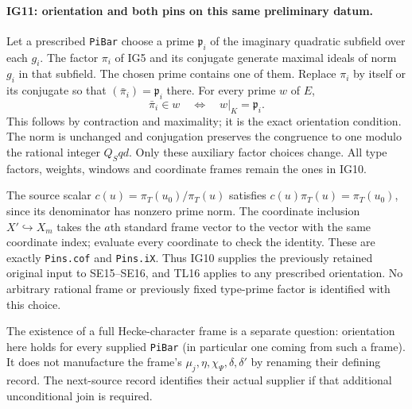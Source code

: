 \paragraph{IG11: orientation and both pins on this same preliminary datum.}
Let a prescribed \texttt{PiBar} choose a prime
$\mathfrak p_i$ of the imaginary quadratic subfield over
each $g_i$. The factor $\pi_i$ of IG5 and its conjugate
generate maximal ideals of norm $g_i$ in that subfield.
The chosen prime contains one of them. Replace $\pi_i$ by
itself or its conjugate so that
$(\bar\pi_i)=\mathfrak p_i$ there. For every prime $w$ of
$E$,
\[
     \bar\pi_i\in w\quad\Longleftrightarrow\quad
                         w|_K=\mathfrak p_i.           \tag{IG.34}
\]
This follows by contraction and maximality; it is the exact
orientation condition. The norm is unchanged and conjugation
preserves the congruence to one modulo the rational integer
$Q_Sqd$. Only these auxiliary factor choices change. All
type factors, weights, windows and coordinate frames remain
the ones in IG10.

The source scalar $c(u)=\pi_T(u_0)/\pi_T(u)$ satisfies
$c(u)\pi_T(u)=\pi_T(u_0)$, since its denominator has nonzero
prime norm. The coordinate inclusion $X'\hookrightarrow X_m$
takes the $a$th standard frame vector to the vector with the
same coordinate index; evaluate every coordinate to check the
identity. These are exactly \texttt{Pins.cof} and
\texttt{Pins.iX}. Thus IG10 supplies the previously retained
original input to SE15--SE16, and TL16 applies to any prescribed
orientation. No arbitrary rational frame or previously fixed
type-prime factor is identified with this choice.

The existence of a full Hecke-character frame is a separate
question: orientation here holds for every supplied
\texttt{PiBar} (in particular one coming from such a frame).
It does not manufacture the frame's $\mu_j,\eta,\chi_\Psi,
\delta,\delta'$ by renaming their defining record. The next-source
record identifies their actual supplier if that additional
unconditional join is required.


